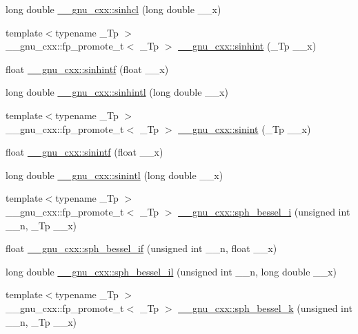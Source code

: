 \begin{DoxyCompactItemize}
\item 
long double \hyperlink{group__gnu__math__spec__func_ga7467a001bb18ef8bff0a7e9927bab356}{\+\_\+\+\_\+gnu\+\_\+cxx\+::sinhcl} (long double \+\_\+\+\_\+x)
\item 
{\footnotesize template$<$typename \+\_\+\+Tp $>$ }\\\+\_\+\+\_\+gnu\+\_\+cxx\+::fp\+\_\+promote\+\_\+t$<$ \+\_\+\+Tp $>$ \hyperlink{group__gnu__math__spec__func_gab5cbc831c5fab99a967c03d059f1ad59}{\+\_\+\+\_\+gnu\+\_\+cxx\+::sinhint} (\+\_\+\+Tp \+\_\+\+\_\+x)
\item 
float \hyperlink{group__gnu__math__spec__func_ga375ca3ceb1eafd678e298d0aea4bb3e6}{\+\_\+\+\_\+gnu\+\_\+cxx\+::sinhintf} (float \+\_\+\+\_\+x)
\item 
long double \hyperlink{group__gnu__math__spec__func_ga8b7f1a070be7233a3179e3cbded387ee}{\+\_\+\+\_\+gnu\+\_\+cxx\+::sinhintl} (long double \+\_\+\+\_\+x)
\item 
{\footnotesize template$<$typename \+\_\+\+Tp $>$ }\\\+\_\+\+\_\+gnu\+\_\+cxx\+::fp\+\_\+promote\+\_\+t$<$ \+\_\+\+Tp $>$ \hyperlink{group__gnu__math__spec__func_ga076c8d52588904f5711c41781f8acfa0}{\+\_\+\+\_\+gnu\+\_\+cxx\+::sinint} (\+\_\+\+Tp \+\_\+\+\_\+x)
\item 
float \hyperlink{group__gnu__math__spec__func_ga8b63406fec50d7e00470521b82fb32a2}{\+\_\+\+\_\+gnu\+\_\+cxx\+::sinintf} (float \+\_\+\+\_\+x)
\item 
long double \hyperlink{group__gnu__math__spec__func_ga3ff83e5c5f1435064b6942ca8b7c8779}{\+\_\+\+\_\+gnu\+\_\+cxx\+::sinintl} (long double \+\_\+\+\_\+x)
\item 
{\footnotesize template$<$typename \+\_\+\+Tp $>$ }\\\+\_\+\+\_\+gnu\+\_\+cxx\+::fp\+\_\+promote\+\_\+t$<$ \+\_\+\+Tp $>$ \hyperlink{group__gnu__math__spec__func_ga156b8154b27b7898c8b2abf4284f7323}{\+\_\+\+\_\+gnu\+\_\+cxx\+::sph\+\_\+bessel\+\_\+i} (unsigned int \+\_\+\+\_\+n, \+\_\+\+Tp \+\_\+\+\_\+x)
\item 
float \hyperlink{group__gnu__math__spec__func_gacc6738f18c1ba19452b9dd814d11c00c}{\+\_\+\+\_\+gnu\+\_\+cxx\+::sph\+\_\+bessel\+\_\+if} (unsigned int \+\_\+\+\_\+n, float \+\_\+\+\_\+x)
\item 
long double \hyperlink{group__gnu__math__spec__func_gaf4392d9ed177913febdcbfccb947dbca}{\+\_\+\+\_\+gnu\+\_\+cxx\+::sph\+\_\+bessel\+\_\+il} (unsigned int \+\_\+\+\_\+n, long double \+\_\+\+\_\+x)
\item 
{\footnotesize template$<$typename \+\_\+\+Tp $>$ }\\\+\_\+\+\_\+gnu\+\_\+cxx\+::fp\+\_\+promote\+\_\+t$<$ \+\_\+\+Tp $>$ \hyperlink{group__gnu__math__spec__func_ga288b28f2c6995d052a4f5f17293cbf1a}{\+\_\+\+\_\+gnu\+\_\+cxx\+::sph\+\_\+bessel\+\_\+k} (unsigned int \+\_\+\+\_\+n, \+\_\+\+Tp \+\_\+\+\_\+x)

\end{DoxyCompactItemize}
